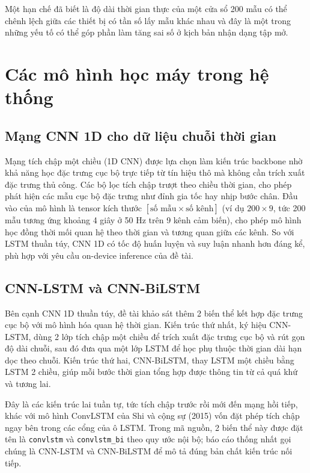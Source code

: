 \documentclass[../DoAn.tex]{subfiles}
\begin{document}
Một hạn chế đã biết là độ dài thời gian thực của một cửa sổ 200 mẫu có thể chênh lệch giữa các thiết bị có tần số lấy mẫu khác nhau và đây là một trong những yếu tố có thể góp phần làm tăng sai số ở kịch bản nhận dạng tập mở.

\section{Các mô hình học máy trong hệ thống}
\label{sec:mohinh}

\subsection{Mạng CNN 1D cho dữ liệu chuỗi thời gian}

Mạng tích chập một chiều (1D CNN) được lựa chọn làm kiến trúc backbone nhờ khả năng học đặc trưng cục bộ trực tiếp từ tín hiệu thô mà không cần trích xuất đặc trưng thủ công. Các bộ lọc tích chập trượt theo chiều thời gian, cho phép phát hiện các mẫu cục bộ đặc trưng như đỉnh gia tốc hay nhịp bước chân. Đầu vào của mô hình là tensor kích thước $[\text{số mẫu} \times \text{số kênh}]$ (ví dụ $200 \times 9$, tức 200 mẫu tương ứng khoảng 4 giây ở 50 Hz trên 9 kênh cảm biến), cho phép mô hình học đồng thời mối quan hệ theo thời gian và tương quan giữa các kênh. So với LSTM thuần túy, CNN 1D có tốc độ huấn luyện và suy luận nhanh hơn đáng kể, phù hợp với yêu cầu on-device inference của đề tài.

\subsection{CNN-LSTM và CNN-BiLSTM}

Bên cạnh CNN 1D thuần túy, đề tài khảo sát thêm 2 biến thể kết hợp đặc trưng cục bộ với mô hình hóa quan hệ thời gian. Kiến trúc thứ nhất, ký hiệu CNN-LSTM, dùng 2 lớp tích chập một chiều để trích xuất đặc trưng cục bộ và rút gọn độ dài chuỗi, sau đó đưa qua một lớp LSTM để học phụ thuộc thời gian dài hạn dọc theo chuỗi. Kiến trúc thứ hai, CNN-BiLSTM, thay LSTM một chiều bằng LSTM 2 chiều, giúp mỗi bước thời gian tổng hợp được thông tin từ cả quá khứ và tương lai.

Đây là các kiến trúc lai tuần tự, tức tích chập trước rồi mới đến mạng hồi tiếp, khác với mô hình ConvLSTM của Shi và cộng sự (2015) vốn đặt phép tích chập ngay bên trong các cổng của ô LSTM. Trong mã nguồn, 2 biến thể này được đặt tên là \texttt{convlstm} và \texttt{convlstm\_bi} theo quy ước nội bộ; báo cáo thống nhất gọi chúng là CNN-LSTM và CNN-BiLSTM để mô tả đúng bản chất kiến trúc nối tiếp.
\end{document}

